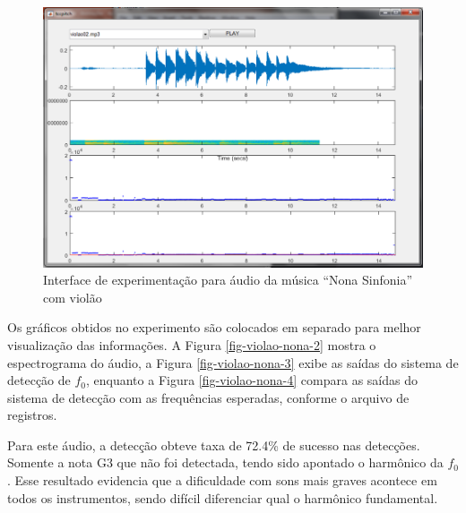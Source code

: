 \begin{figure}
	\centering
	\includegraphics[width=0.75\linewidth]{pasta1_figuras/violao-nona.png}
	\caption{Interface de experimentação para áudio da música ``Nona Sinfonia'' com violão}
	\label{fig-violao-nona}
\end{figure}

Os gráficos obtidos no experimento são colocados em separado para melhor visualização das informações. A Figura \ref{fig-violao-nona-2} mostra o espectrograma do áudio, a Figura \ref{fig-violao-nona-3} exibe as saídas do sistema de detecção de $f_0$, enquanto a Figura \ref{fig-violao-nona-4} compara as saídas do sistema de detecção com as frequências esperadas, conforme o arquivo de registros.


Para este áudio, a detecção obteve taxa de 72.4\% de sucesso nas detecções. Somente a nota G3 que não foi detectada, tendo sido apontado o harmônico da $f_0$. Esse resultado evidencia que a dificuldade com sons mais graves acontece em todos os instrumentos, sendo difícil diferenciar qual o harmônico fundamental.

